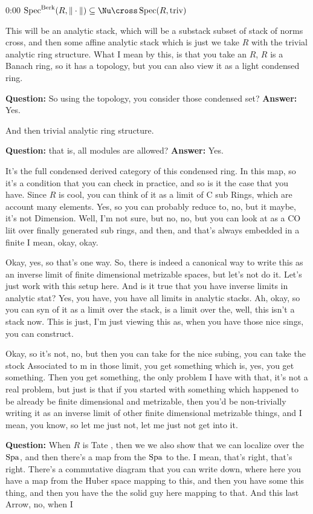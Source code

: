 \begin{unfinished}{0:00}
$\Spec^\Berk (R, \norm{\cdot}) \subseteq \Nu \cross \Spec(R, \text{triv})$ 

This will be an analytic stack, which will be a substack subset of stack of norms cross, and then some affine analytic stack which is just we take $R$ with the trivial analytic ring structure. What I mean by this, is that you take an $R$, $R$ is a Banach ring, so it has a topology, but you can also view it as a light condensed ring. 

\textbf{Question:} So using the topology, you consider those condensed set?
\textbf{Answer:} Yes.

And then trivial analytic ring structure.

\textbf{Question:} that is, all modules are allowed?
\textbf{Answer:} Yes.


It's the full condensed derived category of this condensed ring.
In this map, so it's a condition that you can check in practice, and so is it the case that you have. Since $R$ is cool, you can think of it as a limit of C sub Rings, which are account many elements. Yes, so you can probably reduce to, no, but it maybe, it's not Dimension. Well, I'm not sure, but no, no, but you can look at as a CO liit over finally generated sub rings, and then, and that's always embedded in a finite I mean, okay, okay.

Okay, yes, so that's one way. So, there is indeed a canonical way to write this as an inverse limit of finite dimensional metrizable spaces, but let's not do it. Let's just work with this setup here. And is it true that you have inverse limits in analytic stat? Yes, you have, you have all limits in analytic stacks. Ah, okay, so you can syn of it as a limit over the stack, is a limit over the, well, this isn't a stack now. This is just, I'm just viewing this as, when you have those nice sings, you can construct.

Okay, so it's not, no, but then you can take for the nice subing, you can take the stock Associated to m in those limit, you get something which is, yes, you get something. Then you get something, the only problem I have with that, it's not a real problem, but just is that if you started with something which happened to be already be finite dimensional and metrizable, then you'd be non-trivially writing it as an inverse limit of other finite dimensional metrizable things, and I mean, you know, so let me just not, let me just not get into it.

\textbf{Question:} When $R$ is Tate , then we we also show that we can localize over the $\operatorname{Spa}$, and then there's a map from the $\operatorname{Spa}$ to the. I mean, that's right, that's right. 
There's a commutative diagram that you can write down, where here you have a map from the Huber space mapping to this, and then you have some this thing, and then you have the the solid guy here mapping to that. And this last Arrow, no, when I 


\end{unfinished}
